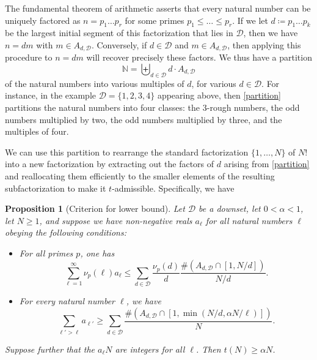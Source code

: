 \documentclass[10pt,a4paper,reqno]{amsart}
\numberwithin{equation}{section}
\theoremstyle{plain}
\newtheorem{proposition}[theorem]{Proposition}
\theoremstyle{definition}
\newcommand\N{\mathbb{N}}
\begin{document}
The fundamental theorem of arithmetic asserts that every natural number can be uniquely factored as $n = p_1 \dots p_r$ for some primes $p_1 \leq \dots \leq p_r$.  If we let $d \coloneqq p_1 \dots p_k$ be the largest initial segment of this factorization that lies in ${\mathcal D}$, then we have $n=dm$ with $m \in A_{d,{\mathcal D}}$.  Conversely, if $d \in {\mathcal D}$ and $m \in A_{d,{\mathcal D}}$, then applying this procedure to $n=dm$ will recover precisely these factors.  We thus have a partition
\begin{equation}\label{partition}
 \N = \biguplus_{d \in {\mathcal D}} d \cdot A_{d,{\mathcal D}}
\end{equation}
of the natural numbers into various multiples of $d$, for various $d \in {\mathcal D}$.  For instance, in the example ${\mathcal D} = \{1,2,3,4\}$ appearing above, then \eqref{partition} partitions the natural numbers into four classes: the $3$-rough numbers, the odd numbers multiplied by two, the odd numbers multiplied by three, and the multiples of four.

We can use this partition to rearrange the standard factorization $\{1,\dots,N\}$ of $N!$ into a new factorization by extracting out the factors of $d$ arising from \eqref{partition} and reallocating them efficiently to the smaller elements of the resulting subfactorization to make it $t$-admissible.  Specifically, we have

\begin{proposition}[Criterion for lower bound]\label{rearrange-crit}  Let ${\mathcal D}$ be a downset, let $0 < \alpha < 1$, let $N \geq 1$, and suppose we have non-negative reals $a_\ell$ for all natural numbers $\ell$ obeying the following conditions:
  \begin{itemize}
  \item[(i)]  For all primes $p$, one has
  \begin{equation}\label{i-eq-1}
     \sum_{\ell=1}^\infty \nu_p(\ell) a_\ell  \leq \sum_{d \in {\mathcal D}} \frac{\nu_p(d)}{d} \frac{\# (A_{d,{\mathcal D}} \cap [1,N/d])}{N/d}.
  \end{equation}
  \item[(ii)]  For every natural number $\ell$, we have
  \begin{equation}\label{l-eq-1} \sum_{\ell' > \ell} a_{\ell'} \geq \sum_{d \in {\mathcal D}} \frac{\# (A_{d,{\mathcal D}} \cap [1,\min(N/d, \alpha N/\ell)])}{N}.
  \end{equation}
  \end{itemize}
  Suppose further that the $a_\ell N$ are integers for all $\ell$.   Then $t(N) \geq \alpha N$.
  \end{proposition}
\end{document}
